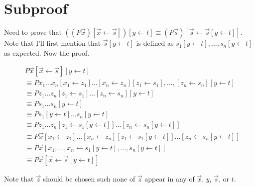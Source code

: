 \documentclass[12pt]{article}
\begin{document}
\section{Subproof}

Need to prove that $((P\vec{x})[\vec{x}\leftarrow \vec{s}])[y\leftarrow t] \equiv (P\vec{s})[\vec{s}\leftarrow \vec{s}[y\leftarrow t]]$. Note that I'll first mention that $\vec{s}[y\leftarrow t]$ is defined as $s_1[y\leftarrow t],\ldots,s_n[y\leftarrow t]$ as expected. Now the proof.

\begin{align}
&P\vec{x}[\vec{x}\leftarrow \vec{s}][y\leftarrow t]\\
&\equiv Px_1\ldots x_n[x_1\leftarrow z_1]\ldots[x_n\leftarrow z_n][z_1\leftarrow s_1],\ldots,[z_n\leftarrow s_n][y\leftarrow t]\\
&\equiv Pz_1\ldots z_n[z_1\leftarrow s_1]\ldots[z_n\leftarrow s_n][y\leftarrow t]\\
&\equiv Ps_1\ldots s_n[y\leftarrow t]\\
&\equiv Ps_1[y\leftarrow t]\ldots s_n[y\leftarrow t]\\
&\equiv Pz_1\ldots z_n[z_1\leftarrow s_1[y\leftarrow t]]\ldots[z_n\leftarrow s_n[y\leftarrow t]]\\
&\equiv P\vec{x}[x_1\leftarrow z_1]\ldots[x_n\leftarrow z_n][z_1\leftarrow s_1[y\leftarrow t]]\ldots[z_n\leftarrow s_n[y\leftarrow t]]\\
&\equiv P\vec{x}[x_1,\ldots,x_n\leftarrow s_1[y\leftarrow t],\ldots, s_n[y\leftarrow t]]\\
&\equiv P\vec{x}[\vec{x}\leftarrow \vec{s}[y\leftarrow t]]
\end{align}

Note that $\vec{z}$ should be chosen such none of $\vec{z}$ appear in any of $\vec{x}$, $y$, $\vec{s}$, or $t$.
\end{document}
